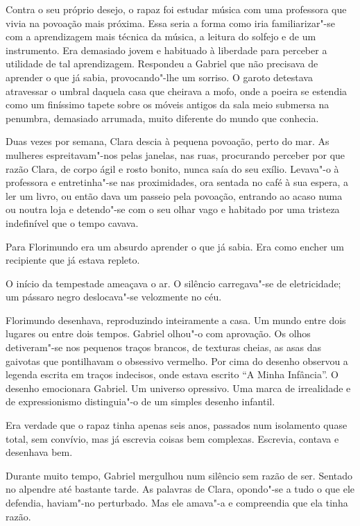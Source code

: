 Contra o seu próprio desejo, o rapaz foi estudar música com uma
professora que vivia na povoação mais próxima. Essa seria a forma como
iria familiarizar"-se com a aprendizagem mais técnica da música, a
leitura do solfejo e de um instrumento. Era demasiado jovem e habituado
à liberdade para perceber a utilidade de tal aprendizagem. Respondeu a
Gabriel que não precisava de aprender o que já sabia, provocando"-lhe um
sorriso. O garoto detestava atravessar o umbral daquela casa que
cheirava a mofo, onde a poeira se estendia como um finíssimo tapete
sobre os móveis antigos da sala meio submersa na penumbra, demasiado
arrumada, muito diferente do mundo que conhecia.

Duas vezes por semana, Clara descia à pequena povoação, perto do mar. As
mulheres espreitavam"-nos pelas janelas, nas ruas, procurando perceber
por que razão Clara, de corpo ágil e rosto bonito, nunca saía do seu
exílio. Levava"-o à professora e entretinha"-se nas proximidades, ora
sentada no café à sua espera, a ler um livro, ou então dava um passeio
pela povoação, entrando ao acaso numa ou noutra loja e detendo"-se com o
seu olhar vago e habitado por uma tristeza indefinível que o tempo
cavava.

Para Florimundo era um absurdo aprender o que já sabia. Era como encher
um recipiente que já estava repleto.

O início da tempestade ameaçava o ar. O silêncio carregava"-se de
eletricidade; um pássaro negro deslocava"-se velozmente no céu.

Florimundo desenhava, reproduzindo inteiramente a casa. Um mundo entre
dois lugares ou entre dois tempos. Gabriel olhou"-o com aprovação. Os
olhos detiveram"-se nos pequenos traços brancos, de texturas cheias, as
asas das gaivotas que pontilhavam o obsessivo vermelho. Por cima do
desenho observou a legenda escrita em traços indecisos, onde estava
escrito ``A Minha Infância''. O desenho emocionara Gabriel. Um universo
opressivo. Uma marca de irrealidade e de expressionismo distinguia"-o de
um simples desenho infantil.

Era verdade que o rapaz tinha apenas seis anos, passados num isolamento
quase total, sem convívio, mas já escrevia coisas bem complexas.
Escrevia, contava e desenhava bem.

Durante muito tempo, Gabriel mergulhou num silêncio sem razão de ser.
Sentado no alpendre até bastante tarde. As palavras de Clara, opondo"-se
a tudo o que ele defendia, haviam"-no perturbado. Mas ele amava"-a e
compreendia que ela tinha razão.


